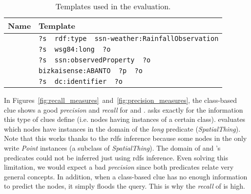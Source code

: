 \begin{table}[h!tbp]
  \centering
  \begin{tabular}{ll}
    \hline
    Name & Template \\
    \hline
    \tplone{} & \texttt{?s~~rdf:type~~ssn-weather:RainfallObservation} \\
    \tpltwo{} & \texttt{?s~~wsg84:long~~?o} \\
    \tplthree{} & \texttt{?s~~ssn:observedProperty~~?o} \\
    \tplfour{} & \texttt{bizkaisense:ABANTO~~?p~~?o} \\
    \tplfive{} & \texttt{?s~~dc:identifier~~?o} \\
    \hline
  \end{tabular}
  \caption{Templates used in the evaluation.}
  \label{tab:evaluationTemplates}
\end{table}

In Figures~\ref{fig:recall_measures}~and~\ref{fig:precision_measures}, the class-based clue shows a good \emph{precision} and \emph{recall} for \tplone{} and \tpltwo{}.
\tplone{} asks exactly for the information this type of clues define (i.e. nodes having instances of a certain class).
\tpltwo{} evaluates which nodes have instances in the domain of the \emph{long} predicate (\emph{SpatialThing}).
Note that this works thanks to the \acs{rdfs} inference because some nodes in the \Space{} only write \emph{Point} instances (a subclass of \emph{SpatialThing}).
The domain of \tplthree{} and \tplfive{}'s predicates could not be inferred just using \acs{rdfs} inference. %
Even solving this limitation, we would expect a bad \emph{precision} since both predicates relate very general concepts.
In addition, when a class-based clue has no enough information to predict the nodes, it simply floods the query.
This is why the \emph{recall} of \tplfour{} is high.





